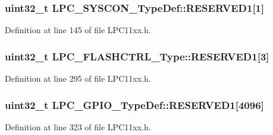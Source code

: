 \subsubsection[{\texorpdfstring{R\+E\+S\+E\+R\+V\+E\+D1}{RESERVED1}}]{\setlength{\rightskip}{0pt plus 5cm}uint32\+\_\+t L\+P\+C\+\_\+\+S\+Y\+S\+C\+O\+N\+\_\+\+Type\+Def\+::\+R\+E\+S\+E\+R\+V\+E\+D1\mbox{[}1\mbox{]}}\hypertarget{group___l_p_c11xx___definitions_gab6f6035ebae5d3f6b21c40f152417cd2}{}\label{group___l_p_c11xx___definitions_gab6f6035ebae5d3f6b21c40f152417cd2}


Definition at line 145 of file L\+P\+C11xx.\+h.

\subsubsection[{\texorpdfstring{R\+E\+S\+E\+R\+V\+E\+D1}{RESERVED1}}]{ uint32\+\_\+t L\+P\+C\+\_\+\+F\+L\+A\+S\+H\+C\+T\+R\+L\+\_\+\+Type\+::\+R\+E\+S\+E\+R\+V\+E\+D1\mbox{[}3\mbox{]}}\hypertarget{group___l_p_c11xx___definitions_ga4c960baaa0123b6be73d4342af7f1f63}{}\label{group___l_p_c11xx___definitions_ga4c960baaa0123b6be73d4342af7f1f63}


Definition at line 295 of file L\+P\+C11xx.\+h.

\subsubsection[{\texorpdfstring{R\+E\+S\+E\+R\+V\+E\+D1}{RESERVED1}}]{\setlength{\rightskip}{0pt plus 5cm}uint32\+\_\+t L\+P\+C\+\_\+\+G\+P\+I\+O\+\_\+\+Type\+Def\+::\+R\+E\+S\+E\+R\+V\+E\+D1\mbox{[}4096\mbox{]}}\hypertarget{group___l_p_c11xx___definitions_ga0c03729e6952253d21fc84623affecc8}{}\label{group___l_p_c11xx___definitions_ga0c03729e6952253d21fc84623affecc8}


Definition at line 323 of file L\+P\+C11xx.\+h.

